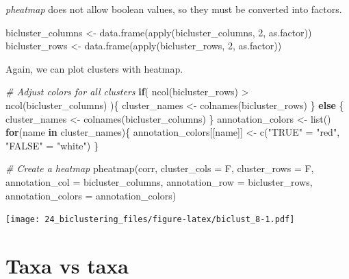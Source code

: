 \documentclass[
]{book}
\newenvironment{Shaded}{\begin{snugshade}}{\end{snugshade}}
\newcommand{\AttributeTok}[1]{\textcolor[rgb]{0.77,0.63,0.00}{#1}}
\newcommand{\CommentTok}[1]{\textcolor[rgb]{0.56,0.35,0.01}{\textit{#1}}}
\newcommand{\ControlFlowTok}[1]{\textcolor[rgb]{0.13,0.29,0.53}{\textbf{#1}}}
\newcommand{\DecValTok}[1]{\textcolor[rgb]{0.00,0.00,0.81}{#1}}
\newcommand{\FunctionTok}[1]{\textcolor[rgb]{0.00,0.00,0.00}{#1}}
\newcommand{\NormalTok}[1]{#1}
\newcommand{\OtherTok}[1]{\textcolor[rgb]{0.56,0.35,0.01}{#1}}
\newcommand{\SpecialCharTok}[1]{\textcolor[rgb]{0.00,0.00,0.00}{#1}}
\newcommand{\StringTok}[1]{\textcolor[rgb]{0.31,0.60,0.02}{#1}}
\begin{document}
\emph{pheatmap} does not allow boolean values, so they must be converted into factors.

\begin{Shaded}
\begin{Highlighting}[]
\NormalTok{bicluster\_columns }\OtherTok{\textless{}{-}} \FunctionTok{data.frame}\NormalTok{(}\FunctionTok{apply}\NormalTok{(bicluster\_columns, }\DecValTok{2}\NormalTok{, as.factor))}
\NormalTok{bicluster\_rows }\OtherTok{\textless{}{-}} \FunctionTok{data.frame}\NormalTok{(}\FunctionTok{apply}\NormalTok{(bicluster\_rows, }\DecValTok{2}\NormalTok{, as.factor))}
\end{Highlighting}
\end{Shaded}

Again, we can plot clusters with heatmap.

\begin{Shaded}
\begin{Highlighting}[]
\CommentTok{\# Adjust colors for all clusters}
\ControlFlowTok{if}\NormalTok{( }\FunctionTok{ncol}\NormalTok{(bicluster\_rows) }\SpecialCharTok{\textgreater{}} \FunctionTok{ncol}\NormalTok{(bicluster\_columns) )\{}
\NormalTok{  cluster\_names }\OtherTok{\textless{}{-}} \FunctionTok{colnames}\NormalTok{(bicluster\_rows)}
\NormalTok{\} }\ControlFlowTok{else}\NormalTok{ \{}
\NormalTok{  cluster\_names }\OtherTok{\textless{}{-}} \FunctionTok{colnames}\NormalTok{(bicluster\_columns)}
\NormalTok{\}}
\NormalTok{annotation\_colors }\OtherTok{\textless{}{-}} \FunctionTok{list}\NormalTok{()}
\ControlFlowTok{for}\NormalTok{(name }\ControlFlowTok{in}\NormalTok{ cluster\_names)\{}
\NormalTok{  annotation\_colors[[name]] }\OtherTok{\textless{}{-}} \FunctionTok{c}\NormalTok{(}\StringTok{"TRUE"} \OtherTok{=} \StringTok{"red"}\NormalTok{, }\StringTok{"FALSE"} \OtherTok{=} \StringTok{"white"}\NormalTok{)}
\NormalTok{\}}

\CommentTok{\# Create a heatmap}
\FunctionTok{pheatmap}\NormalTok{(corr, }\AttributeTok{cluster\_cols =}\NormalTok{ F, }\AttributeTok{cluster\_rows =}\NormalTok{ F,}
         \AttributeTok{annotation\_col =}\NormalTok{ bicluster\_columns, }
         \AttributeTok{annotation\_row =}\NormalTok{ bicluster\_rows,}
         \AttributeTok{annotation\_colors =}\NormalTok{ annotation\_colors)}
\end{Highlighting}
\end{Shaded}

\texttt{[image: 24\_biclustering\_files/figure-latex/biclust\_8-1.pdf]}

\hypertarget{taxa-vs-taxa}{%
\section{Taxa vs taxa}\label{taxa-vs-taxa}}
\end{document}
